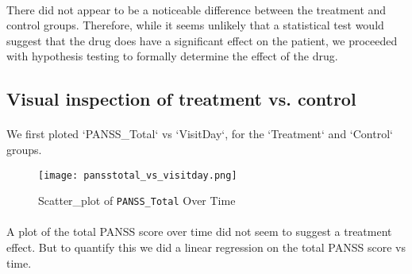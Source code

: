 \documentclass{article}
\begin{document}
	\paragraph{}There did not appear to be a noticeable difference between the treatment and control groups. Therefore, while it seems unlikely that a statistical test would suggest that the drug does have a significant effect on the patient, we proceeded with hypothesis testing to formally determine the effect of the drug. 
	
	\subsection{Visual inspection of treatment vs. control}
	\paragraph{}We first ploted `PANSS\_Total` vs `VisitDay`, for the `Treatment` and `Control` groups. 
	\begin{figure}[H]
		\centering
		\texttt{[image: pansstotal\_vs\_visitday.png]}
		\caption{Scatter\_plot of \texttt{PANSS\_Total} Over Time }
	\end{figure}
\paragraph{}A plot of the total PANSS score over time did not seem to suggest a treatment effect. But to quantify this we did a linear regression on the total PANSS score vs time.
\end{document}
